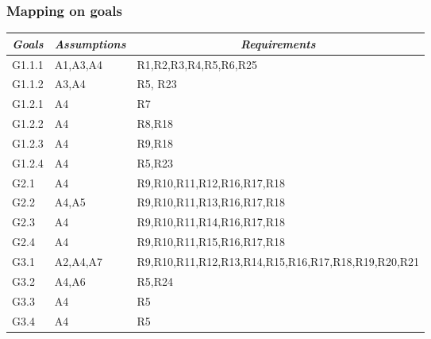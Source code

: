 \subsubsection{Mapping on goals}
\begin{table}[H]
	\centering
	\begin{tabularx}{\linewidth}{|l|X|X|}
		\hline
		\multicolumn{1}{c|}{\textit{\textbf{Goals}}} & \multicolumn{1}{c|}{\textit{\textbf{Assumptions}}} &
		\multicolumn{1}{c|}{\textit{\textbf{Requirements}}}
		                                                 \tabularnewline \hline
		G1.1.1 &
		A1,A3,A4&
		R1,R2,R3,R4,R5,R6,R25
		\tabularnewline
		\hline
		G1.1.2 & 
		A3,A4&
		R5, R23
		\tabularnewline
		\hline
		G1.2.1 & 
		A4&
		R7
		\tabularnewline
		\hline
		G1.2.2 & 
		A4&
		R8,R18
		\tabularnewline
		\hline
		G1.2.3 & 
		A4&
		R9,R18
		\tabularnewline
		\hline
		G1.2.4 & 
		A4&
		R5,R23
		\tabularnewline
		\hline
		G2.1 & 
		A4&
		R9,R10,R11,R12,R16,R17,R18
		\tabularnewline
		\hline
		G2.2 & 
		A4,A5&
		R9,R10,R11,R13,R16,R17,R18
		\tabularnewline
		\hline
		G2.3 & 
		A4&
		R9,R10,R11,R14,R16,R17,R18
		\tabularnewline
		\hline
		G2.4 & 
		A4&
		R9,R10,R11,R15,R16,R17,R18
		\tabularnewline
		\hline
		G3.1 & 
		A2,A4,A7&
		R9,R10,R11,R12,R13,R14,R15,R16,R17,R18,R19,R20,R21
		\tabularnewline
		\hline
		G3.2 & 
		A4,A6&
		R5,R24
		\tabularnewline
		\hline
		G3.3 & 
		A4&
		R5
		\tabularnewline
		\hline
		G3.4 & 
		A4&
		R5
		\tabularnewline
		\hline
	\end{tabularx}   
\end{table}


